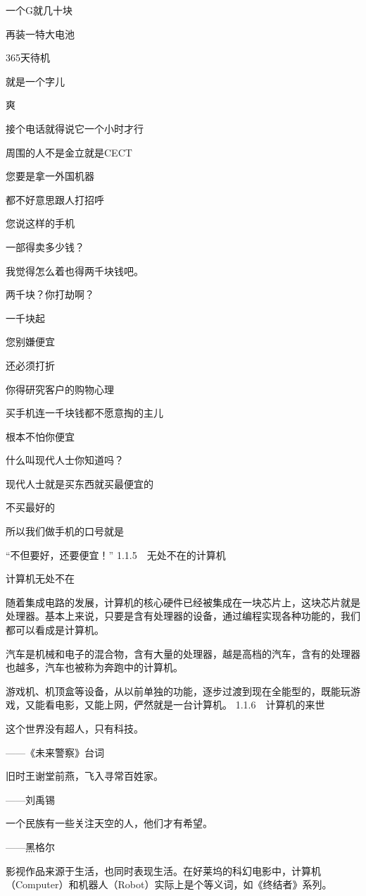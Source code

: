 \documentclass[12pt,UTF8]{ctexbook}
\begin{document}
一个G就几十块

再装一特大电池

365天待机

就是一个字儿

爽

接个电话就得说它一个小时才行

周围的人不是金立就是CECT

您要是拿一外国机器

都不好意思跟人打招呼

您说这样的手机

一部得卖多少钱？

我觉得怎么着也得两千块钱吧。

两千块？你打劫啊？

一千块起

您别嫌便宜

还必须打折

你得研究客户的购物心理

买手机连一千块钱都不愿意掏的主儿

根本不怕你便宜

什么叫现代人士你知道吗？

现代人士就是买东西就买最便宜的

不买最好的

所以我们做手机的口号就是

“不但要好，还要便宜！”
1.1.5　无处不在的计算机

计算机无处不在

随着集成电路的发展，计算机的核心硬件已经被集成在一块芯片上，这块芯片就是处理器。基本上来说，只要是含有处理器的设备，通过编程实现各种功能的，我们都可以看成是计算机。

汽车是机械和电子的混合物，含有大量的处理器，越是高档的汽车，含有的处理器也越多，汽车也被称为奔跑中的计算机。

游戏机、机顶盒等设备，从以前单独的功能，逐步过渡到现在全能型的，既能玩游戏，又能看电影，又能上网，俨然就是一台计算机。
1.1.6　计算机的来世

这个世界没有超人，只有科技。

——《未来警察》台词

旧时王谢堂前燕，飞入寻常百姓家。

——刘禹锡

一个民族有一些关注天空的人，他们才有希望。

——黑格尔

影视作品来源于生活，也同时表现生活。在好莱坞的科幻电影中，计算机（Computer）和机器人（Robot）实际上是个等义词，如《终结者》系列。
\end{document}
